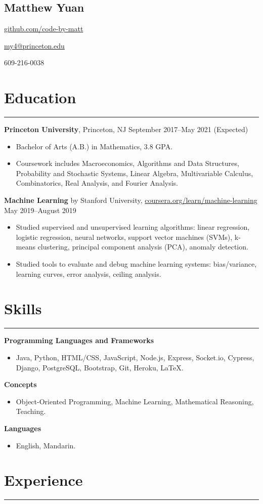 \documentclass[10pt]{article}
\newcommand{\name}[1]{\begin{center}\section*{\huge #1}\end{center}}
\newcommand{\topinfo}[1]{\begin{center}\vspace{-0.2cm}#1\vspace{-0.2cm}\end{center}}
\newcommand{\resumesection}[1]{\vspace{-0.2cm}\section*{#1}\vspace{-0.2cm}\hrule\vspace{0.2cm}}
\begin{document}
\name{Matthew Yuan}
\topinfo{\href{https://github.com/code-by-matt}{github.com/code-by-matt}}
\topinfo{\href{mailto:my4@princeton.edu}{my4@princeton.edu}}
\topinfo{609-216-0038}

\resumesection{Education}

\textbf{Princeton University}, Princeton, NJ \hfill September 2017--May 2021 (Expected)
\begin{itemize}
	\item Bachelor of Arts (A.B.) in Mathematics, 3.8 GPA.
	\item Coursework includes Macroeconomics, Algorithms and Data Structures, Probability and Stochastic Systems, Linear Algebra, Multivariable Calculus, Combinatorics, Real Analysis, and Fourier Analysis.
\end{itemize}

\textbf{Machine Learning} by Stanford University, \href{https://www.coursera.org/learn/machine-learning}{coursera.org/learn/machine-learning} \hfill May 2019--August 2019
\begin{itemize}
	\item Studied supervised and unsupervised learning algorithms: linear regression, logistic regression, neural networks, support vector machines (SVMs), k-means clustering, principal component analysis (PCA), anomaly detection.
	\item Studied tools to evaluate and debug machine learning systems: bias/variance, learning curves, error analysis, ceiling analysis.
\end{itemize}

\resumesection{Skills}

\textbf{Programming Languages and Frameworks}
\begin{itemize}
	\item Java, Python, HTML/CSS, JavaScript, Node.js, Express, Socket.io, Cypress, Django, PostgreSQL, Bootstrap, Git, Heroku, \LaTeX.
\end{itemize}

\textbf{Concepts}
\begin{itemize}
	\item Object-Oriented Programming, Machine Learning, Mathematical Reasoning, Teaching.
\end{itemize}

\textbf{Languages}
\begin{itemize}
	\item English, Mandarin.
\end{itemize}

\resumesection{Experience}
\end{document}
